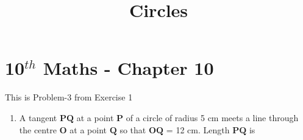\documentclass[12pt]{article}
\let\vec\mathbf
\begin{document}
\begin{center}
\enlargethispage{-4cm}
\title{\textbf{Circles}}
\date{\vspace{-5ex}} %
\maketitle
\end{center}
\setcounter{page}{1}
\section*{10$^{th}$ Maths - Chapter 10}
This is Problem-3 from Exercise 1
\begin{enumerate}
\item A tangent $\vec{PQ}$ at a point $\vec{P}$ of a circle of radius 5 cm meets a line through the centre $\vec{O}$ at a point $\vec{Q}$ so that $\vec{OQ}$ = 12 cm. Length $\vec{PQ}$ is


\end{enumerate}
\end{document}

